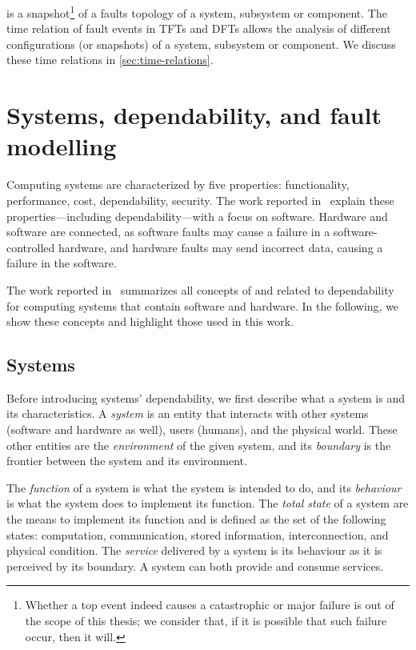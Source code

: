 \documentclass[12pt,openright,twoside,a4paper,oldfontcommands,english,brazil,final]{abntex2}
\theoremstyle{theo}
\begin{document}
 is a snapshot\footnote{Whether a top event indeed causes a catastrophic or major failure is out of the scope of this thesis; we consider that, if it is possible that such failure occur, then it will.} of a faults topology of a system, subsystem or component.
The time relation of fault events in \acp{TFT} and \acp{DFT} allows the analysis of different configurations (or snapshots) of a system, subsystem or component.
We discuss these time relations in \cref{sec:time-relations}.

\section{Systems, dependability, and fault modelling}
\label{sec:dependability}

\begin{sloppypar}
Computing systems are characterized by five properties: functionality, performance, cost, dependability, security.
The work reported in~\cite[p. 289--302]{Sommerville2011} explain these properties---including dependability---with a focus on software.
Hardware and software are connected, as software faults may cause a failure in a software-controlled hardware, and hardware faults may send incorrect data, causing a failure in the software.
\end{sloppypar}

The work reported in~\cite{ALR+2004} summarizes all concepts of and related to dependability for computing systems that contain software and hardware.
In the following, we show these concepts and highlight those used in this work.

\subsection{Systems}

Before introducing systems' dependability, we first describe what a system is and its characteristics.
A \emph{system} is an entity that interacts with other systems (software and hardware as well), users (humans), and the physical world.
These other entities are the \emph{environment} of the given system, and its \emph{boundary} is the frontier between the system and its environment.

The \emph{function} of a system is what the system is intended to do, and its \emph{behaviour} is what the system does to implement its function. 
The \emph{total state} of a system are the means to implement its function and is defined as the set of the following states: computation, communication, stored information, interconnection, and physical condition.
The \emph{service} delivered by a system is its behaviour as it is perceived by its boundary.
A system can both provide and consume services.
\end{document}
